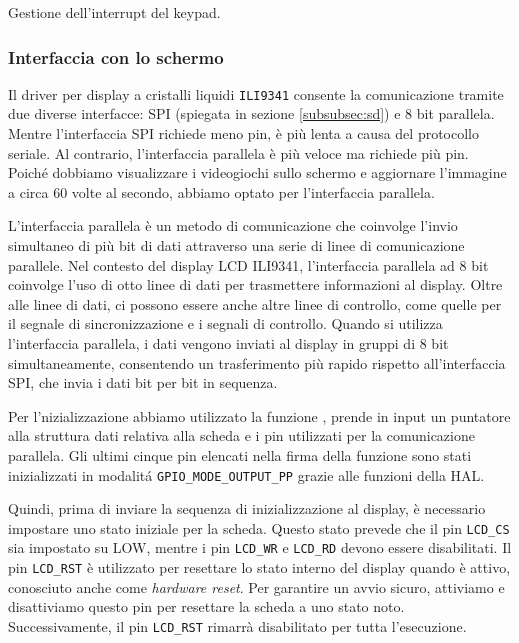 \documentclass[a4paper]{article}
\begin{document}
\begin{Listing}[h!t] %
    \centering
    \caption{Gestione dell'interrupt del keypad.}
    \label{keypad}
\end{Listing}

\subsubsection{Interfaccia con lo schermo}

Il driver per display a cristalli liquidi \texttt{ILI9341} consente la comunicazione tramite due diverse interfacce: SPI (spiegata in sezione \ref{subsubsec:sd}) e 8 bit parallela. Mentre l'interfaccia SPI richiede meno pin, è più lenta a causa del protocollo seriale. Al contrario, l'interfaccia parallela è più veloce ma richiede più pin. Poiché dobbiamo visualizzare i videogiochi sullo schermo e aggiornare l'immagine a circa 60 volte al secondo, abbiamo optato per l'interfaccia parallela.

L'interfaccia parallela è un metodo di comunicazione che coinvolge l'invio simultaneo di più bit di dati attraverso una serie di linee di comunicazione parallele. Nel contesto del display LCD ILI9341, l'interfaccia parallela ad 8 bit coinvolge l'uso di otto linee di dati per trasmettere informazioni al display. Oltre alle linee di dati, ci possono essere anche altre linee di controllo, come quelle per il segnale di sincronizzazione e i segnali di controllo. Quando si utilizza l'interfaccia parallela, i dati vengono inviati al display in gruppi di 8 bit simultaneamente, consentendo un trasferimento più rapido rispetto all'interfaccia SPI, che invia i dati bit per bit in sequenza.

Per l'nizializzazione abbiamo utilizzato la funzione , prende in input un puntatore alla struttura dati relativa alla scheda e i pin utilizzati per la comunicazione parallela. Gli ultimi cinque pin elencati nella firma della funzione sono stati inizializzati in modalitá \texttt{GPIO\_MODE\_OUTPUT\_PP} grazie alle funzioni della HAL.

Quindi, prima di inviare la sequenza di inizializzazione al display, è necessario impostare uno stato iniziale per la scheda. Questo stato prevede che il pin \texttt{LCD\_CS} sia impostato su LOW, mentre i pin \texttt{LCD\_WR} e \texttt{LCD\_RD} devono essere disabilitati. Il pin \texttt{LCD\_RST} è utilizzato per resettare lo stato interno del display quando è attivo, conosciuto anche come \textit{hardware reset}. Per garantire un avvio sicuro, attiviamo e disattiviamo questo pin per resettare la scheda a uno stato noto. Successivamente, il pin \texttt{LCD\_RST} rimarrà disabilitato per tutta l'esecuzione.
\end{document}
